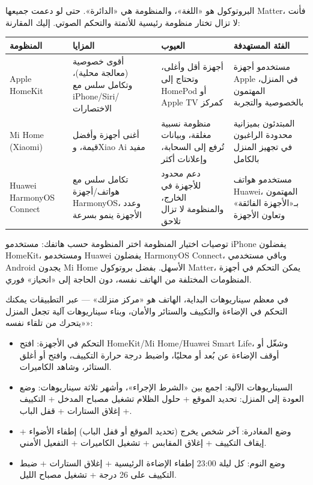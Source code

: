 
البروتوكول هو «اللغة»، والمنظومة هي «الدائرة». حتى لو دعمت جميعها Matter، فأنت لا تزال تختار منظومة رئيسية للأتمتة والتحكم الصوتي. إليك المقارنة:

\begin{center}
\begin{tabularx}{\linewidth}{|X|X|X|X|}
\hline
\textbf{المنظومة} & \textbf{المزايا} & \textbf{العيوب} & \textbf{الفئة المستهدفة} \tabularnewline
\hline
Apple HomeKit & أقوى خصوصية (معالجة محلية)، وتكامل سلس مع iPhone/Siri/الاختصارات & أجهزة أقل وأغلى، وتحتاج إلى HomePod أو Apple TV كمركز & مستخدمو أجهزة Apple في المنزل، المهتمون بالخصوصية والتجربة \tabularnewline
Mi Home (Xiaomi) & أغنى أجهزة وأفضل قيمة، وXiao Ai مفيد & منظومة نسبية مغلقة، وبيانات تُرفع إلى السحابة، وإعلانات أكثر & المبتدئون بميزانية محدودة الراغبون في تجهيز المنزل بالكامل \tabularnewline
Huawei HarmonyOS Connect & تكامل سلس مع هواتف/أجهزة HarmonyOS، وعدد الأجهزة ينمو بسرعة & دعم محدود للأجهزة في الخارج، والمنظومة لا تزال تلاحق & مستخدمو هواتف Huawei، المهتمون بـ«الأجهزة الفائقة» وتعاون الأجهزة \tabularnewline
\hline
\end{tabularx}
\end{center}

\begin{tcbinfo}{توصيات اختيار المنظومة}
اختر المنظومة حسب هاتفك: مستخدمو iPhone يفضلون HomeKit، ومستخدمو Huawei يفضلون HarmonyOS Connect، وباقي مستخدمي Android يجدون Mi Home الأسهل. بفضل بروتوكول Matter، يمكن التحكم في أجهزة المنظومات المختلفة من الهاتف نفسه، دون الحاجة إلى «انحياز» فوري.

\end{tcbinfo}


في معظم سيناريوهات البداية، الهاتف هو «مركز منزلك» — عبر التطبيقات يمكنك التحكم في الإضاءة والتكييف والستائر والأمان، وبناء سيناريوهات آلية تجعل المنزل «يتحرك من تلقاء نفسه»:

\begin{itemize}
  \item التحكم في الأجهزة: افتح HomeKit/Mi Home/Huawei Smart Life، وشغّل أو أوقف الإضاءة عن بُعد أو محليًا، واضبط درجة حرارة التكييف، وافتح أو أغلق الستائر، وشاهد الكاميرات.
  \item السيناريوهات الآلية: اجمع بين «الشرط الإجراء»، وأشهر ثلاثة سيناريوهات: وضع العودة إلى المنزل: تحديد الموقع + حلول الظلام تشغيل مصباح المدخل + التكييف + إغلاق الستارات + قفل الباب.
  \item وضع المغادرة: آخر شخص يخرج (تحديد الموقع أو قفل الباب) إطفاء الأضواء + إيقاف التكييف + إغلاق المقابس + تشغيل الكاميرات + التفعيل الأمني.
  \item وضع النوم: كل ليلة 23:00 إطفاء الإضاءة الرئيسية + إغلاق الستارات + ضبط التكييف على 26 درجة + تشغيل مصباح الليل.
\end{itemize}

